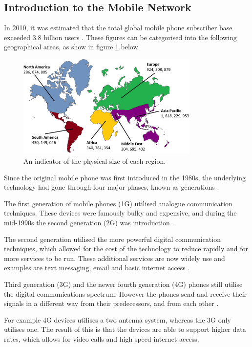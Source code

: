 \subsection{Introduction to the Mobile Network}
In 2010, it was estimated that the total global mobile phone subscriber base 
exceeded 3.8 billion users \citep{mpirical10}. These figures can be categorised 
into the following geographical areas, as show in figure \ref{fig:subscriberBase} 
below.

\begin{figure}[H]
  \centering
    \includegraphics[width=0.8\textwidth]{chapter3/mobile_networks/subscriber_numbers.png}
  \caption{An indicator of the physical size of each region.}
  \label{fig:subscriberBase}
\end{figure}


Since the original mobile phone was first introduced in the 1980s, the 
underlying technology had gone through four major phases, known as generations 
\citep{cox08}.

The first generation of mobile phones (1G) utilised analogue communication 
techniques. These devices were famously bulky and expensive, and during the 
mid-1990s the second generation (2G) was introduction \citep{cox08}.

The second generation utilised the more powerful digital communication 
techniques, which allowed for the cost of the technology to reduce rapidly and 
for more services to be run. These additional services are now widely use and 
examples are text messaging, email and basic internet access \citep{cox08}.

Third generation (3G) and the newer fourth generation (4G) phones still utilise 
the digital communications spectrum. However the phones send and receive their 
signals in a different way from their predecessors, and from each other 
\citep{cox08}. 

For example 4G devices utilises a two antenna system, whereas the 3G only 
utilises one. The result of this is that the devices are able to support higher
data rates, which allows for video calls and high speed internet access.

